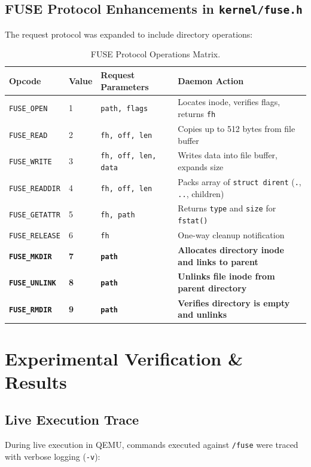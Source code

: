 \documentclass[11pt,a4paper]{article}
\begin{document}
\subsection{FUSE Protocol Enhancements in \texttt{kernel/fuse.h}}
The request protocol was expanded to include directory operations:
\begin{table}[htbp]
\centering
\begin{tabular}{@{}llll@{}}
\toprule
\textbf{Opcode} & \textbf{Value} & \textbf{Request Parameters} & \textbf{Daemon Action} \\ \midrule
\texttt{FUSE\_OPEN}    & 1 & \texttt{path, flags}             & Locates inode, verifies flags, returns \texttt{fh} \\
\texttt{FUSE\_READ}    & 2 & \texttt{fh, off, len}            & Copies up to 512 bytes from file buffer \\
\texttt{FUSE\_WRITE}   & 3 & \texttt{fh, off, len, data}      & Writes data into file buffer, expands size \\
\texttt{FUSE\_READDIR} & 4 & \texttt{fh, off, len}            & Packs array of \texttt{struct dirent} (\texttt{.}, \texttt{..}, children) \\
\texttt{FUSE\_GETATTR} & 5 & \texttt{fh, path}                & Returns \texttt{type} and \texttt{size} for \texttt{fstat()} \\
\texttt{FUSE\_RELEASE} & 6 & \texttt{fh}                      & One-way cleanup notification \\
\textbf{\texttt{FUSE\_MKDIR}}   & \textbf{7} & \textbf{\texttt{path}}  & \textbf{Allocates directory inode and links to parent} \\
\textbf{\texttt{FUSE\_UNLINK}}  & \textbf{8} & \textbf{\texttt{path}}  & \textbf{Unlinks file inode from parent directory} \\
\textbf{\texttt{FUSE\_RMDIR}}   & \textbf{9} & \textbf{\texttt{path}}  & \textbf{Verifies directory is empty and unlinks} \\ \bottomrule
\end{tabular}
\caption{FUSE Protocol Operations Matrix.}
\label{tab:protocol}
\end{table}

\section{Experimental Verification \& Results}

\subsection{Live Execution Trace}
During live execution in QEMU, commands executed against \texttt{/fuse} were traced with verbose logging (\texttt{-v}):
\end{document}
